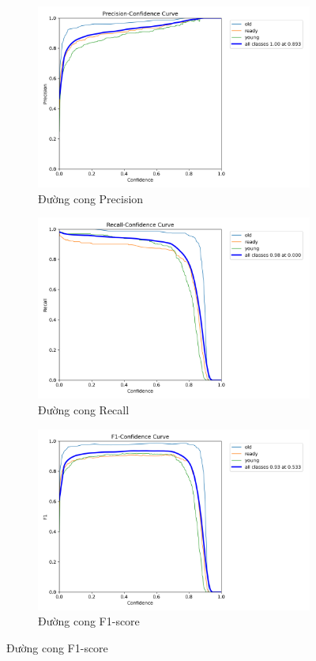 \begin{figure}
    \centering
    \begin{subfigure}{.5\textwidth}
        \includegraphics[width=0.95\linewidth]{images/P_curve.png}
    \caption{Đường cong Precision}
    \label{fig:training-result-p}

    \end{subfigure}%
    \begin{subfigure}{.5\textwidth}
        \includegraphics[width=0.95\linewidth]{images/R_curve.png}
    \caption{Đường cong Recall}
    \label{fig:training-result-r}
    \end{subfigure}
    \begin{subfigure}{.5\textwidth}
        \includegraphics[width=0.95\linewidth]{images/F1_curve.png}
    \caption{Đường cong F1-score}
    \label{fig:training-result-f1}


\end{subfigure}
\end{figure}

